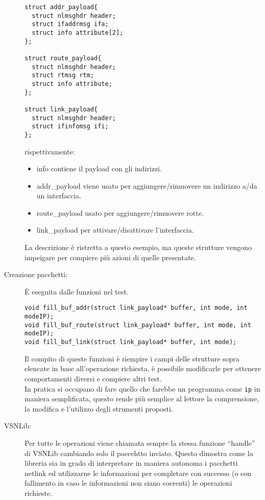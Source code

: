 \begin{description}
\begin{lstlisting}[style=CStyle]
  struct addr_payload{
  struct nlmsghdr header;
  struct ifaddrmsg ifa;
  struct info attribute[2];
};

struct route_payload{
  struct nlmsghdr header;
  struct rtmsg rtm;
  struct info attribute;
};

struct link_payload{
  struct nlmsghdr header;
  struct ifinfomsg ifi;
};

\end{lstlisting}
rispettivamente:
\begin{itemize}
  \item info contiene il payload con gli indirizzi.
  \item addr\_payload viene usato per aggiungere/rimuovere un indirizzo a/da un interfaccia.
  \item route\_payload usato per aggiungere/rimuovere rotte.
  \item link\_payload per attivare/disattivare l'interfaccia.
\end{itemize}
La descrizione \`e ristretta a questo esempio, ma queste strutture vengono impeigare per compiere pi\`u azioni di quelle presentate.
\item[Creazione pacchetti: ]\`E eseguita dalle funzioni nel test.
\begin{lstlisting}[style=CStyle]
void fill_buf_addr(struct link_payload* buffer, int mode, int modeIP);
void fill_buf_route(struct link_payload* buffer, int mode, int modeIP);
void fill_buf_link(struct link_payload* buffer, int mode);
\end{lstlisting}
Il compito di queste funzioni \`e riempire i campi delle strutture sopra elencate in base all'operazione richiesta, \`e possibile modificarle per ottenere comportamenti diversi e compiere altri test.\\
In pratica si occupano di fare quello che farebbe un programma come \texttt{ip} in maniera semplificata, questo rende pi\`u semplice al lettore la comprensione, la modifica e l'utilizzo degli strumenti proposti.
\item[VSNLib: ]Per tutte le operazioni viene chiamata sempre la stessa funzione ``handle'' di VSNLib cambiando solo il paccehtto inviato. Questo dimostra come la libreria sia in grado di interpretare in maniera autonoma i pacchetti netlink ed utilizzarne le informazioni per completare con successo (o con fallimento in caso le informazioni non siano coerenti) le operazioni richieste.
\end{description}
